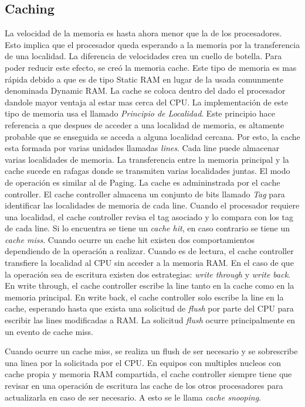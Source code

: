 \subsection{Caching} La velocidad de la memoria es hasta ahora menor que la de
los procesadores. Esto implica que el procesador queda esperando a la memoria
por la transferencia de una localidad. La diferencia de velocidades crea un
cuello de botella. Para poder reducir este efecto, se creó la memoria
cache. Este tipo de memoria es mas rápida debido a que es de tipo Static RAM en
lugar de la usada comunmente denominada Dynamic RAM. La cache se coloca dentro
del dado el procesador dandole mayor ventaja al estar mas cerca del CPU. La
implementación de este tipo de memoria usa el llamado \emph{Principio de
Localidad}. Este principio hace referencia a que despues de acceder a una
localidad de memoria, es altamente probable que se enseguida se acceda a alguna
localidad cercana. Por esto, la cache esta formada por varias unidades llamadas
\emph{lines}. Cada line puede almacenar varias localidades de memoria. La
transferencia entre la memoria principal y la cache sucede en rafagas donde se
transmiten varias localidades juntas. El modo de operación es similar al de
Paging. La cache es admininstrada por el cache controller. El cache controller
almacena un conjunto de bits llamado \emph{Tag} para identificar las
localidades de memoria de cada line. Cuando el procesador requiere una
localidad, el cache controller revisa el tag asociado y lo compara con los tag
de cada line. Si lo encuentra se tiene un \emph{cache hit}, en caso contrario
se tiene un \emph{cache miss}. Cuando ocurre un cache hit existen dos
comportamientos dependiendo de la operación a realizar. Cuando es de lectura,
el cache controller transfiere la localidad al CPU sin acceder a la memoria
RAM. En el caso de que la operación sea de escritura existen dos estrategias:
\emph{write through} y \emph{write back}. En write through, el cache controller
escribe la line tanto en la cache como en la memoria principal. En write back,
el cache controller solo escribe la line en la cache, esperando hasta que
exista una solicitud de \emph{flush} por parte del CPU para escribir las lines
modificadas a RAM. La solicitud \emph{flush} ocurre principalmente en un evento
de cache miss.

Cuando ocurre un cache miss, se realiza un flush de ser necesario y se
sobrescribe una linea por la solicitada por el CPU. En equipos con multiples
nucleos con cache propia y memoria RAM compartida, el cache controller siempre
tiene que revisar en una operación de escritura las cache de los otros
procesadores para actualizarla en caso de ser necesario. A esto se le llama
\emph{cache snooping}.

